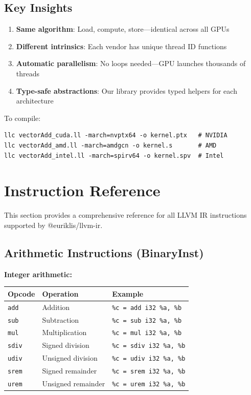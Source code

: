 \documentclass[11pt]{article}
\begin{document}
\subsection{Key Insights}

\begin{enumerate}[noitemsep]
  \item \textbf{Same algorithm}: Load, compute, store—identical across all GPUs
  \item \textbf{Different intrinsics}: Each vendor has unique thread ID functions
  \item \textbf{Automatic parallelism}: No loops needed—GPU launches thousands of threads
  \item \textbf{Type-safe abstractions}: Our library provides typed helpers for each architecture
\end{enumerate}

To compile:
\begin{lstlisting}[style=ts]
llc vectorAdd_cuda.ll -march=nvptx64 -o kernel.ptx   # NVIDIA
llc vectorAdd_amd.ll -march=amdgcn -o kernel.s       # AMD
llc vectorAdd_intel.ll -march=spirv64 -o kernel.spv  # Intel
\end{lstlisting}
\section{Instruction Reference}

This section provides a comprehensive reference for all LLVM IR instructions supported by @euriklis/llvm-ir.

\subsection{Arithmetic Instructions (BinaryInst)}

\textbf{Integer arithmetic:}
\begin{center}
\begin{tabular}{|l|l|l|}
\hline
\textbf{Opcode} & \textbf{Operation} & \textbf{Example} \\
\hline
\texttt{add} & Addition & \texttt{\%c = add i32 \%a, \%b} \\
\texttt{sub} & Subtraction & \texttt{\%c = sub i32 \%a, \%b} \\
\texttt{mul} & Multiplication & \texttt{\%c = mul i32 \%a, \%b} \\
\texttt{sdiv} & Signed division & \texttt{\%c = sdiv i32 \%a, \%b} \\
\texttt{udiv} & Unsigned division & \texttt{\%c = udiv i32 \%a, \%b} \\
\texttt{srem} & Signed remainder & \texttt{\%c = srem i32 \%a, \%b} \\
\texttt{urem} & Unsigned remainder & \texttt{\%c = urem i32 \%a, \%b} \\
\hline
\end{tabular}
\end{center}
\end{document}
